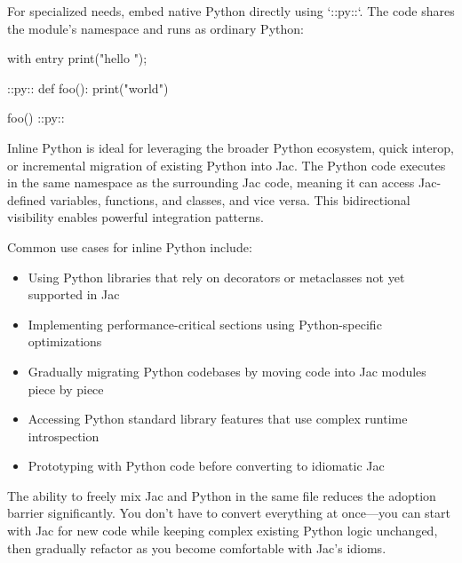 For specialized needs, embed native Python directly using `::py::`. The code shares the module's namespace and runs as ordinary Python:

\begin{jacblock}
with entry {
    print("hello ");
}

::py::
def foo():
    print("world")

foo()
::py::
\end{jacblock}

Inline Python is ideal for leveraging the broader Python ecosystem, quick interop, or incremental migration of existing Python into Jac. The Python code executes in the same namespace as the surrounding Jac code, meaning it can access Jac-defined variables, functions, and classes, and vice versa. This bidirectional visibility enables powerful integration patterns.

Common use cases for inline Python include:
\begin{itemize}
    \item Using Python libraries that rely on decorators or metaclasses not yet supported in Jac
    \item Implementing performance-critical sections using Python-specific optimizations
    \item Gradually migrating Python codebases by moving code into Jac modules piece by piece
    \item Accessing Python standard library features that use complex runtime introspection
    \item Prototyping with Python code before converting to idiomatic Jac
\end{itemize}

The ability to freely mix Jac and Python in the same file reduces the adoption barrier significantly. You don't have to convert everything at once—you can start with Jac for new code while keeping complex existing Python logic unchanged, then gradually refactor as you become comfortable with Jac's idioms.

